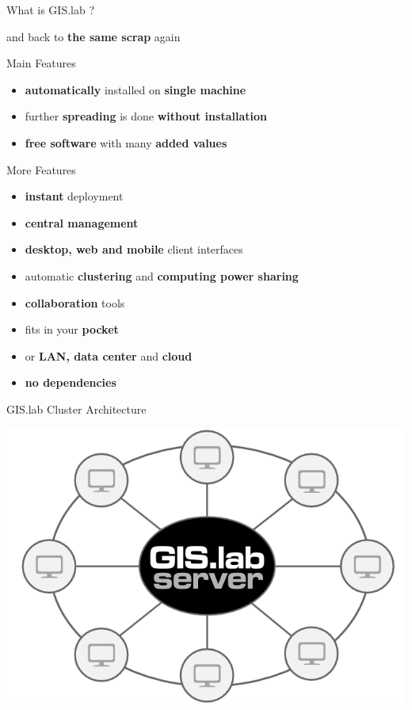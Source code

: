 \documentclass[12pt]{beamer}
\begin{document}
\begin{frame}{What is GIS.lab ?}
	\begin{center}
		and back to \textbf{the same scrap} again
	\end{center}
\end{frame}

\begin{frame}{Main Features}
	\begin{itemize}
		\item \textbf{automatically} installed on \textbf{single machine}
		\item further \textbf{spreading} is done \textbf{without installation}
		\item \textbf{free software} with many \textbf{added values}
	\end{itemize}
\end{frame}

\begin{frame}{More Features}
	\begin{itemize}[<+->]
		\item \textbf{instant} deployment
		\item \textbf{central management}
		\item \textbf{desktop, web and mobile} client interfaces
		\item automatic \textbf{clustering} and \textbf{computing power sharing}
		\item \textbf{collaboration} tools
		\item fits in your \textbf{pocket}
		\item or \textbf{LAN, data center} and \textbf{cloud}
		\item \textbf{no dependencies}
	\end{itemize}
\end{frame}

\begin{frame}{GIS.lab Cluster Architecture}
	\begin{center}
		\includegraphics[keepaspectratio=true,height=0.8\textheight]{images/gislab-cluster-architecture.png}
	\end{center}
\end{frame}
\end{document}

